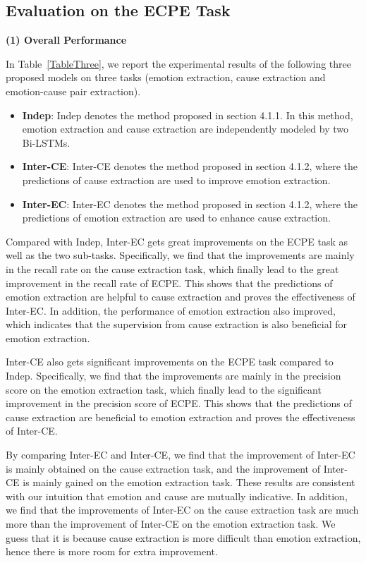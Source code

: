 \documentclass[11pt,a4paper]{article}
\begin{document}
\subsection{Evaluation on the ECPE Task}


\noindent \textbf{(1) Overall Performance}

In Table~\ref{TableThree}, we report the experimental results of the following three proposed models on three tasks (emotion extraction, cause extraction and emotion-cause pair extraction).


\begin{itemize}
	\item \textbf{Indep}: Indep denotes the method proposed in section 4.1.1. In this method, emotion extraction and cause extraction are independently modeled by two Bi-LSTMs.
	\item \textbf{Inter-CE}: Inter-CE denotes the method proposed in section 4.1.2, where the predictions of cause extraction are used to improve emotion extraction.
	\item \textbf{Inter-EC}: Inter-EC denotes the method proposed in section 4.1.2, where the predictions of emotion extraction are used to enhance cause extraction.
\end{itemize}


Compared with Indep, Inter-EC gets great improvements on the ECPE task as well as the two sub-tasks. Specifically, we find that the improvements are mainly in the recall rate on the cause extraction task, which finally lead to the great improvement in the recall rate of ECPE. This shows that the predictions of emotion extraction are helpful to cause extraction and proves the effectiveness of Inter-EC. In addition, the performance of emotion extraction also improved, which indicates that the supervision from cause extraction is also beneficial for emotion extraction. 

Inter-CE also gets significant improvements on the ECPE task compared to Indep. Specifically, we find that the improvements are mainly in the precision score on the emotion extraction task, which finally lead to the significant improvement in the precision score of ECPE. This shows that the predictions of cause extraction are beneficial to emotion extraction and proves the effectiveness of Inter-CE.  

By comparing Inter-EC and Inter-CE, we find that the improvement of Inter-EC is mainly obtained on the cause extraction task, and the improvement of Inter-CE is mainly gained on the emotion extraction task. These results are consistent with our intuition that emotion and cause are mutually indicative. In addition, we find that the improvements of Inter-EC on the cause extraction task are much more than the improvement of Inter-CE on the emotion extraction task. We guess that it is because cause extraction is more difficult than emotion extraction, hence there is more room for extra improvement.
\end{document}
